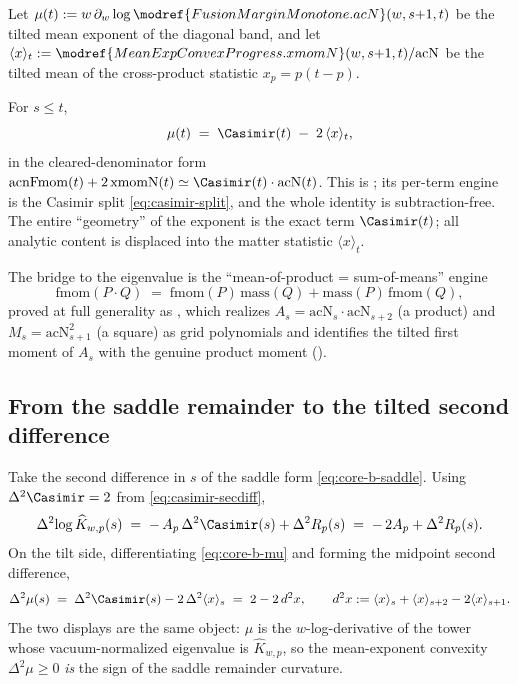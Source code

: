 Let $\mu(t) := w\,\partial_w\log \modref{FusionMarginMonotone.acN}(w,s{+}1,t)$ be the
tilted mean exponent of the diagonal band, and let
$\langle x\rangle_t := \modref{MeanExpConvexProgress.xmomN}(w,s{+}1,t)/\mathrm{acN}$
be the tilted mean of the cross-product statistic $x_p=p(t-p)$.

\begin{theorem}
\label{thm:core-b-mu}
For $s\le t$,
\begin{equation}
  \mu(t) \;=\; \Casimir(t) \;-\; 2\,\langle x\rangle_t,
  \label{eq:core-b-mu}
\end{equation}
in the cleared-denominator form
$\mathrm{acnFmom}(t) + 2\,\mathrm{xmomN}(t)\simeq\Casimir(t)\cdot\mathrm{acN}(t)$.
This is ; its per-term engine is the Casimir
split \eqref{eq:casimir-split}, and the whole identity is subtraction-free.  The
entire ``geometry'' of the exponent is the exact term $\Casimir(t)$; all analytic
content is displaced into the matter statistic $\langle x\rangle_t$.
\end{theorem}

The bridge to the eigenvalue is the ``mean-of-product = sum-of-means'' engine
\begin{equation}
  \mathrm{fmom}(P\cdot Q) \;=\; \mathrm{fmom}(P)\,\mathrm{mass}(Q)
    + \mathrm{mass}(P)\,\mathrm{fmom}(Q),
  \label{eq:core-b-pfmom}
\end{equation}
proved at full generality as , which
realizes $A_s = \mathrm{acN}_s\cdot\mathrm{acN}_{s+2}$ (a product) and
$M_s = \mathrm{acN}_{s+1}^{2}$ (a square) as grid polynomials and identifies the
tilted first moment of $A_s$ with the genuine product moment
().

\subsection{From the saddle remainder to the tilted second difference}

Take the second difference in $s$ of the saddle form \eqref{eq:core-b-saddle}.  Using
$\Delta^2\Casimir = 2$ from \eqref{eq:casimir-secdiff},
\begin{equation}
  \Delta^2\!\log\widehat K_{w,p}(s)
    \;=\; -\,A_p\,\Delta^2\Casimir(s) + \Delta^2 R_p(s)
    \;=\; -\,2A_p + \Delta^2 R_p(s).
  \label{eq:core-b-secdiff-log}
\end{equation}
On the tilt side, differentiating \eqref{eq:core-b-mu} and forming the midpoint
second difference,
\begin{equation}
  \Delta^2\mu(s)
    \;=\; \Delta^2\Casimir(s) - 2\,\Delta^2\langle x\rangle_s
    \;=\; 2 - 2\,d^2 x,
  \qquad
  d^2 x := \langle x\rangle_s + \langle x\rangle_{s+2} - 2\langle x\rangle_{s+1}.
  \label{eq:core-b-d2x}
\end{equation}
The two displays are the same object: $\mu$ is the $w$-log-derivative of the tower
whose vacuum-normalized eigenvalue is $\widehat K_{w,p}$, so the mean-exponent
convexity $\Delta^2\mu\ge 0$ \emph{is} the sign of the saddle remainder curvature.

